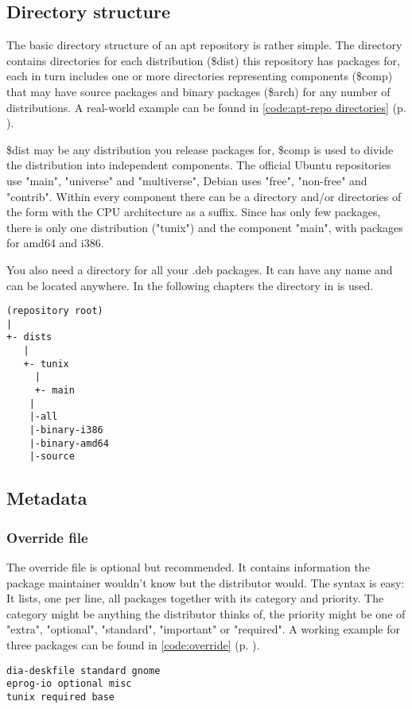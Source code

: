 \subsection{Directory structure}\label{directory structure}
The basic directory structure of an apt repository is rather simple. 
The  directory contains directories for
each distribution (\$dist) this repository has packages for, each in turn
includes one or more directories representing components (\$comp) that may have
source packages and binary packages (\$arch) for any number of distributions. A
real-world example can be found in \lstlistingname{} \ref{code:apt-repo directories}
(p. \pageref{code:apt-repo directories}).

\$dist may be any distribution you release packages for, \$comp is used to
divide the distribution into independent components. The official Ubuntu
repositories use "main", "universe" and "multiverse", Debian uses "free",
"non-free" and "contrib". Within every component there can be a 
directory and/or directories of the form  with the CPU
architecture as a suffix. Since \tunix{} has only few packages, there is only one
distribution ("tunix") and the component "main", with packages for amd64 and
i386.

You also need a directory for all your .deb packages. It can have any name and
can be located anywhere. In the following chapters the directory  in
 is used.

\begin{lstlisting}[label=code:apt-repo directories,caption=Basic structure of an
apt repository, float=ht]
(repository root)
|
+- dists
   |
   +- tunix
     |
     +- main
	|
	|-all
	|-binary-i386
	|-binary-amd64
	|-source
\end{lstlisting}

\subsection{Metadata}
\subsubsection{Override file}
The override file is optional but recommended. It contains information the
package maintainer wouldn't know but the distributor would. The
syntax is easy: It lists, one per line, all packages together with its category
and priority. The category might be anything the distributor thinks of, the
priority might be one of "extra", "optional", "standard", "important" or
"required". A working example for three
packages can be found in \lstlistingname{} \ref{code:override} (p.
\pageref{code:override}).
\begin{lstlisting}[label=code:override,caption=override file, float=ht]
dia-deskfile standard gnome
eprog-io optional misc
tunix required base
\end{lstlisting}

